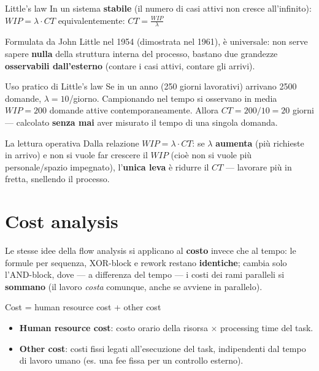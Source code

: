 \begin{boxtheorem}{Little's law}
In un sistema \textbf{stabile} (il numero di casi attivi non cresce all'infinito): \(WIP = \lambda \cdot CT\) equivalentemente: \(CT = \frac{WIP}{\lambda}\)

Formulata da John Little nel 1954 (dimostrata nel 1961), è universale: non serve sapere \textbf{nulla} della struttura interna del processo, bastano due grandezze \textbf{osservabili dall'esterno} (contare i casi attivi, contare gli arrivi).
\end{boxtheorem}

\begin{boxexample}{Uso pratico di Little's law}
Se in un anno (250 giorni lavorativi) arrivano 2500 domande, $\lambda = 10$/giorno. Campionando nel tempo si osservano in media $WIP=200$ domande attive contemporaneamente. Allora $CT = 200/10 = 20$ giorni — calcolato \textbf{senza mai} aver misurato il tempo di una singola domanda.
\end{boxexample}

\begin{boxtip}{La lettura operativa}
Dalla relazione $WIP = \lambda \cdot CT$: se $\lambda$ \textbf{aumenta} (più richieste in arrivo) e non si vuole far crescere il $WIP$ (cioè non si vuole più personale/spazio impegnato), l'\textbf{unica leva} è ridurre il $CT$ — lavorare più in fretta, snellendo il processo.
\end{boxtip}

\section{\texorpdfstring{Cost analysis}{Cost analysis}}

Le stesse idee della flow analysis si applicano al \textbf{costo} invece che al tempo: le formule per sequenza, XOR-block e rework restano \textbf{identiche}; cambia solo l'AND-block, dove — a differenza del tempo — i costi dei rami paralleli si \textbf{sommano} (il lavoro \emph{costa} comunque, anche se avviene in parallelo).

\begin{boxnote}{Cost = human resource cost + other cost}
\begin{itemize}
\item \textbf{Human resource cost}: costo orario della risorsa $\times$ processing time del task.
\item \textbf{Other cost}: costi fissi legati all'esecuzione del task, indipendenti dal tempo di lavoro umano (es. una fee fissa per un controllo esterno).
\end{itemize}
\end{boxnote}

